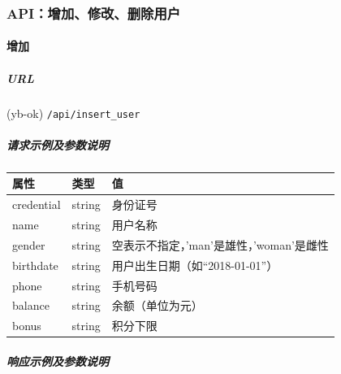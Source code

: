 \documentclass[]{article}
\let\oldparagraph\paragraph
\renewcommand{\paragraph}[1]{\oldparagraph{#1}\mbox{}}
\let\oldsubparagraph\subparagraph
\renewcommand{\subparagraph}[1]{\oldsubparagraph{#1}\mbox{}}
\begin{document}
\hypertarget{apiux589eux52a0ux4feeux6539ux5220ux9664ux7528ux6237}{%
\subsubsection{API：增加、修改、删除用户}\label{apiux589eux52a0ux4feeux6539ux5220ux9664ux7528ux6237}}

\hypertarget{ux589eux52a0}{%
\paragraph{增加}\label{ux589eux52a0}}

\hypertarget{url-9}{%
\subparagraph{URL}\label{url-9}}

(yb-ok) \texttt{/api/insert\_user}

\hypertarget{ux8bf7ux6c42ux793aux4f8bux53caux53c2ux6570ux8bf4ux660e}{%
\subparagraph{请求示例及参数说明}\label{ux8bf7ux6c42ux793aux4f8bux53caux53c2ux6570ux8bf4ux660e}}

\begin{Shaded}
\begin{Highlighting}[]
\FunctionTok{\{}
    \FunctionTok{:}\FunctionTok{,}
    \FunctionTok{:}\FunctionTok{,}
    \ErrorTok{//} 
\FunctionTok{\}}
\end{Highlighting}
\end{Shaded}

\begin{longtable}[]{@{}lll@{}}
\toprule
属性 & 类型 & 值\tabularnewline
\midrule
\endhead
credential & string & 身份证号\tabularnewline
name & string & 用户名称\tabularnewline
gender & string &
空表示不指定，'man'是雄性，'woman'是雌性\tabularnewline
birthdate & string & 用户出生日期（如``2018-01-01''）\tabularnewline
phone & string & 手机号码\tabularnewline
balance & string & 余额（单位为元）\tabularnewline
bonus & string & 积分下限\tabularnewline
\bottomrule
\end{longtable}

\hypertarget{ux54cdux5e94ux793aux4f8bux53caux53c2ux6570ux8bf4ux660e-1}{%
\subparagraph{响应示例及参数说明}\label{ux54cdux5e94ux793aux4f8bux53caux53c2ux6570ux8bf4ux660e-1}}

\begin{Shaded}
\begin{Highlighting}[]
\FunctionTok{\{}
    \FunctionTok{:}\FunctionTok{,}
    \FunctionTok{:}
\FunctionTok{\}}
\end{Highlighting}
\end{Shaded}
\end{document}
